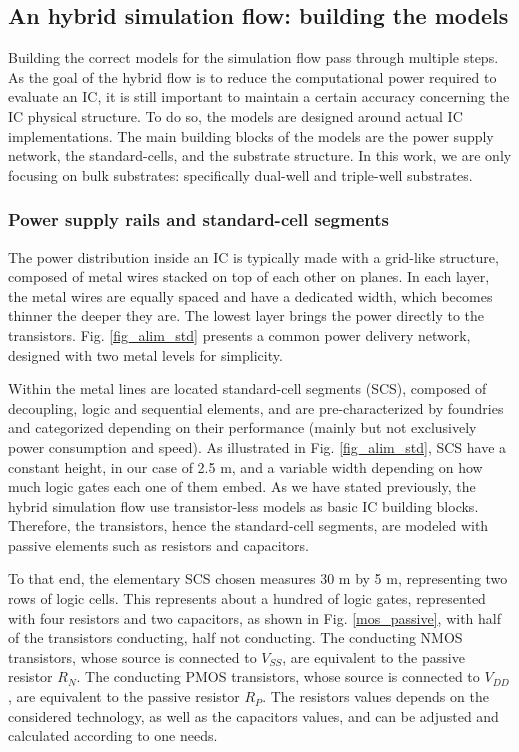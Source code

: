 \subsection{An hybrid simulation flow: building the models}
	Building the correct models for the simulation flow pass through multiple steps.
	As the goal of the hybrid flow is to reduce the computational power required to evaluate an IC, it is still important to maintain a certain accuracy concerning the IC physical structure.
	To do so, the models are designed around actual IC implementations.
	The main building blocks of the models are the power supply network, the standard-cells, and the substrate structure.
	In this work, we are only focusing on bulk substrates: specifically dual-well and triple-well substrates.

	\subsubsection{Power supply rails and standard-cell segments}
		
		The power distribution inside an IC is typically made with a grid-like structure, composed of metal wires stacked on top of each other on planes.
		In each layer, the metal wires are equally spaced and have a dedicated width, which becomes thinner the deeper they are.
		The lowest layer brings the power directly to the transistors.
		Fig. \ref{fig_alim_std} presents a common power delivery network, designed with two metal levels for simplicity.

		Within the metal lines are located standard-cell segments (SCS), composed of decoupling, logic and sequential elements, and are pre-characterized by foundries and categorized depending on their performance (mainly but not exclusively power consumption and speed).
		As illustrated in Fig. \ref{fig_alim_std}, SCS have a constant height, in our case of 2.5 \textmu m, and a variable width depending on how much logic gates each one of them embed.
		As we have stated previously, the hybrid simulation flow use transistor-less models as basic IC building blocks.
		Therefore, the transistors, hence the standard-cell segments, are modeled with passive elements such as resistors and capacitors.

		
		To that end, the elementary SCS chosen measures 30 \textmu m by 5 \textmu m, representing two rows of logic cells.
		This represents about a hundred of logic gates, represented with four resistors and two capacitors, as shown in Fig. \ref{mos_passive}, with half of the transistors conducting, half not conducting.
		The conducting NMOS transistors, whose source is connected to $V_{SS}$, are equivalent to the passive resistor $R_N$.
		The conducting PMOS transistors, whose source is connected to $V_{DD}$, are equivalent to the passive resistor $R_P$.
		The resistors values depends on the considered technology, as well as the capacitors values, and can be adjusted and calculated according to one needs.

